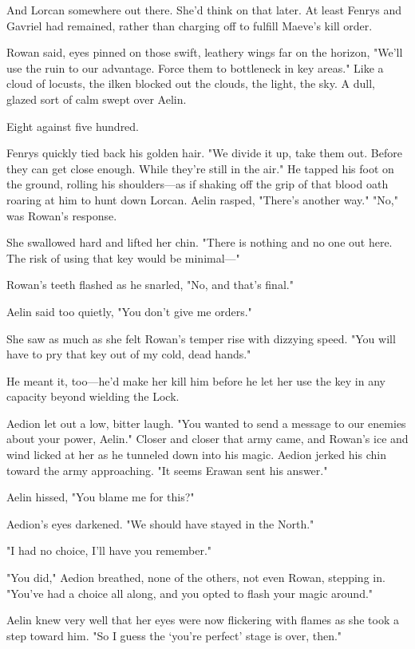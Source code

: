 And Lorcan  somewhere out there. She'd think on that later. At least Fenrys and Gavriel had remained, rather than charging off to fulfill Maeve's kill order.

Rowan said, eyes pinned on those swift, leathery wings far on the horizon, "We'll use the ruin to our advantage. Force them to bottleneck in key areas." Like a cloud of locusts, the ilken blocked out the clouds, the light, the sky. A dull, glazed sort of calm swept over Aelin.

Eight against five hundred.

Fenrys quickly tied back his golden hair. "We divide it up, take them out. Before they can get close enough. While they're still in the air." He tapped his foot on the ground, rolling his shoulders---as if shaking off the grip of that blood oath roaring at him to hunt down Lorcan. Aelin rasped, "There's another way." "No," was Rowan's response.

She swallowed hard and lifted her chin. "There is nothing and no one out here. The risk of using that key would be minimal---"

Rowan's teeth flashed as he snarled, "No, and that's final."

Aelin said too quietly, "You don't give me orders."

She saw as much as she felt Rowan's temper rise with dizzying speed. "You will have to pry that key out of my cold, dead hands."

He meant it, too---he'd make her kill him before he let her use the key in any capacity beyond wielding the Lock.

Aedion let out a low, bitter laugh. "You wanted to send a message to our enemies about your power, Aelin." Closer and closer that army came, and Rowan's ice and wind licked at her as he tunneled down into his magic. Aedion jerked his chin toward the army approaching. "It seems Erawan sent his answer."

Aelin hissed, "You blame me for this?"

Aedion's eyes darkened. "We should have stayed in the North."

"I had no choice, I'll have you remember."

"You did," Aedion breathed, none of the others, not even Rowan, stepping in. "You've had a choice all along, and you opted to flash your magic around."

Aelin knew very well that her eyes were now flickering with flames as she took a step toward him. "So I guess the `you're perfect' stage is over, then."

